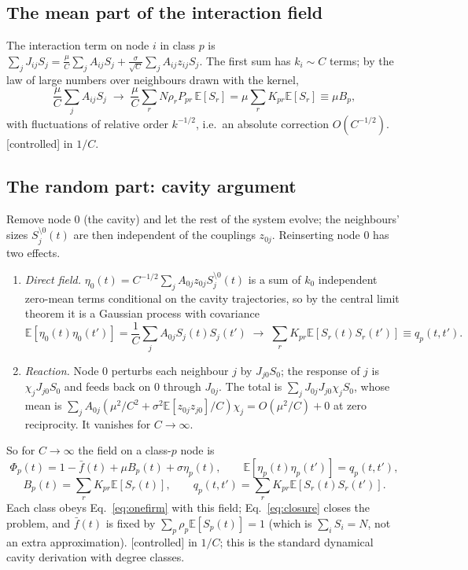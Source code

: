 \documentclass[11pt]{article}
\newcommand{\E}{\mathbb E}
\newcommand{\fb}{\bar f}
\newcommand{\controlled}{\textsf{\small[controlled]}}
\begin{document}
\subsection{The mean part of the interaction field}

The interaction term on node $i$ in class $p$ is
$\sum_jJ_{ij}S_j=\frac\mu C\sum_jA_{ij}S_j+\frac{\sigma}{\sqrt C}\sum_jA_{ij}z_{ij}S_j$.
The first sum has $k_i\sim C$ terms; by the law of large numbers over neighbours drawn with the kernel,
\begin{equation}
\frac\mu C\sum_jA_{ij}S_j\;\to\;\frac\mu C\sum_rN\rho_rP_{pr}\,\E[S_r]=\mu\sum_rK_{pr}\E[S_r]\equiv\mu B_p ,
\end{equation}
with fluctuations of relative order $k^{-1/2}$, i.e.\ an absolute correction $O(C^{-1/2})$.
\controlled{} in $1/C$.

\subsection{The random part: cavity argument}

Remove node $0$ (the cavity) and let the rest of the system evolve; the neighbours' sizes $S_j^{\setminus0}(t)$
are then independent of the couplings $z_{0j}$.  Reinserting node $0$ has two effects.
\begin{enumerate}
\item \emph{Direct field.}  $\eta_0(t)=C^{-1/2}\sum_jA_{0j}z_{0j}S_j^{\setminus0}(t)$ is a sum of $k_0$
  independent zero-mean terms conditional on the cavity trajectories, so by the central limit theorem it is a
  Gaussian process with covariance
  \begin{equation}
  \E[\eta_0(t)\eta_0(t')]=\frac1C\sum_jA_{0j}S_j(t)S_j(t')\;\to\;\sum_rK_{pr}\E[S_r(t)S_r(t')]\equiv q_p(t,t') .
  \end{equation}
\item \emph{Reaction.}  Node $0$ perturbs each neighbour $j$ by $J_{j0}S_0$; the response of $j$ is
  $\chi_j J_{j0}S_0$ and feeds back on $0$ through $J_{0j}$.  The total is
  $\sum_jJ_{0j}J_{j0}\chi_jS_0$, whose mean is $\sum_jA_{0j}(\mu^2/C^2+\sigma^2\E[z_{0j}z_{j0}]/C)\chi_j=O(\mu^2/C)+0$
  at zero reciprocity.  It vanishes for $C\to\infty$.
\end{enumerate}
So for $C\to\infty$ the field on a class-$p$ node is
\begin{equation}
\Phi_p(t)=1-\fb(t)+\mu B_p(t)+\sigma\eta_p(t),\qquad \E[\eta_p(t)\eta_p(t')]=q_p(t,t'),
\label{eq:effproc}
\end{equation}
\begin{equation}
B_p(t)=\sum_rK_{pr}\E[S_r(t)],\qquad q_p(t,t')=\sum_rK_{pr}\E[S_r(t)S_r(t')] .
\label{eq:closure}
\end{equation}
Each class obeys Eq.~\eqref{eq:onefirm} with this field; Eq.~\eqref{eq:closure} closes the problem, and
$\fb(t)$ is fixed by $\sum_p\rho_p\E[S_p(t)]=1$ (which is $\sum_iS_i=N$, not an extra approximation).
\controlled{} in $1/C$; this is the standard dynamical cavity derivation
\cite{bunin2017,galla2018,aguirrelopez} with degree classes.
\end{document}
